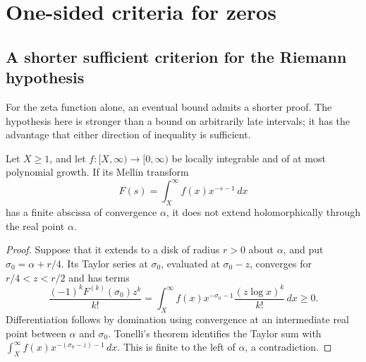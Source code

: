 \section{One-sided criteria for zeros}
\label{sec:one-sided}

\subsection{A shorter sufficient criterion for the Riemann hypothesis}

For the zeta function alone, an eventual bound admits a shorter proof.
The hypothesis here is stronger than a bound on arbitrarily late
intervals; it has the advantage that either direction of inequality
is sufficient.

\begin{lemma}
\label{rh-positive-mellin-boundary}
Let $X\ge1$, and let $f:[X,\infty)\to[0,\infty)$ be locally integrable
and of at most polynomial growth. If its Mellin transform
\[
 F(s)=\int_X^\infty f(x)x^{-s-1}\,dx
\]
has a finite abscissa of convergence $\alpha$, it does not extend
holomorphically through the real point $\alpha$.
\end{lemma}
\begin{proof}
Suppose that it extends to a disk of radius $r>0$ about $\alpha$,
and put $\sigma_0=\alpha+r/4$. Its Taylor series at $\sigma_0$,
evaluated at $\sigma_0-z$, converges for $r/4<z<r/2$ and has terms
\[
 \frac{(-1)^kF^{(k)}(\sigma_0)z^k}{k!}
 =\int_X^\infty f(x)x^{-\sigma_0-1}
                   \frac{(z\log x)^k}{k!}\,dx\ge0.
\]
Differentiation follows by domination using convergence at an
intermediate real point between $\alpha$ and $\sigma_0$.
Tonelli's theorem identifies the Taylor sum with
$\int_X^\infty f(x)x^{-(\sigma_0-z)-1}\,dx$.
This is finite to the left of $\alpha$, a contradiction.
\end{proof}


